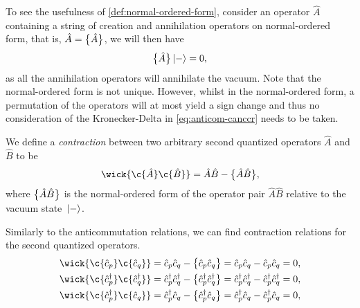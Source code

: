         To see the usefulness of \autoref{def:normal-ordered-form}, consider an
        operator $\hat{A}$ containing a string of creation and annihilation
        operators on normal-ordered form, that is, $\hat{A} = \bigl\{ \hat{A} \bigr\}$,
        we will then have
        \begin{align}
            \bigl\{ \hat{A} \bigr\}\ket*{-} = 0,
        \end{align}
        as all the annihilation operators will annihilate the vacuum.
        Note that the normal-ordered form is not unique.
        However, whilst in the normal-ordered form, a permutation of the
        operators will at most yield a sign change and thus no consideration of
        the Kronecker-Delta in \autoref{eq:anticom-canccr} needs to be taken.

        \begin{definition}
            \label{def:contraction}
            We define a \emph{contraction} between two arbitrary second
            quantized operators $\hat{A}$ and $\hat{B}$ to be
            \begin{align}
                \wick{
                    \c {\hat{A}}
                    \c {\hat{B}}
                }
                = \hat{A}\hat{B}
                - \normalord{\hat{A}\hat{B}},
            \end{align}
            where $\bigl\{ \hat{A}\hat{B} \bigr\}$ is the normal-ordered form of the
            operator pair $\hat{A}\hat{B}$ relative to the vacuum state
            $\ket*{-}$.
        \end{definition}
        Similarly to the anticommutation relations, we can find contraction
        relations for the second quantized operators.
        \begin{gather}
            \wick{
                \c {\can{p}}
                \c {\can{q}}
            }
            = \can{p}\can{q}
            - \normalord{\can{p}\can{q}}
            = \can{p}\can{q}
            - \can{p}\can{q}
            = 0,
            \\
            \wick{
                \c {\ccr{p}}
                \c {\ccr{q}}
            }
            = \ccr{p}\ccr{q}
            - \normalord{\ccr{p}\ccr{q}}
            = \ccr{p}\ccr{q}
            - \ccr{p}\ccr{q}
            = 0,
            \\
            \wick{
                \c {\ccr{p}}
                \c {\can{q}}
            }
            = \ccr{p}\can{q}
            - \normalord{\ccr{p}\can{q}}
            = \ccr{p}\can{q}
            - \ccr{p}\can{q}
            = 0,
        \end{gather}
